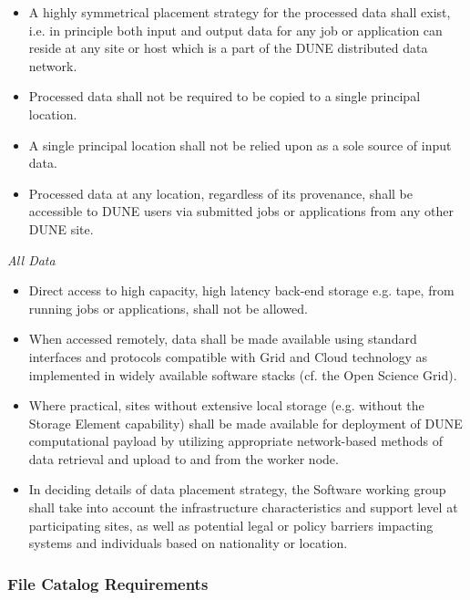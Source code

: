 \begin{itemize}
\item A highly symmetrical placement strategy for the processed data shall exist, i.e. in principle both input and output data for any job or application can reside at any site or host which is a part of the DUNE distributed data network.

\item Processed data shall not be required to be copied to a single principal location.

\item A single principal location shall not be relied upon as a sole source of input data.

\item Processed data at any location, regardless of its provenance,  shall be accessible to DUNE users via submitted jobs or applications from any other DUNE site.
\end{itemize}
\noindent
\textit{All Data}
\begin{itemize}
\item Direct access to high capacity, high latency back-end storage e.g. tape, from running jobs or applications, shall not be allowed.

\item When accessed remotely, data shall be made available using standard interfaces and protocols compatible with Grid and Cloud technology as implemented in widely available software stacks (cf. the Open Science Grid).

\item Where practical, sites without extensive local storage (e.g. without the Storage Element capability) shall be made available for deployment of DUNE 
computational payload by utilizing appropriate network-based methods of data retrieval and upload to and from the worker node.

\item In deciding details of data placement strategy, the Software working group shall take into account the infrastructure characteristics
and support level at participating sites, as well as potential legal or policy barriers impacting systems and individuals based on nationality or location.


\end{itemize}

\subsubsection{File Catalog Requirements}
\label{sec:file-catalog-req}

